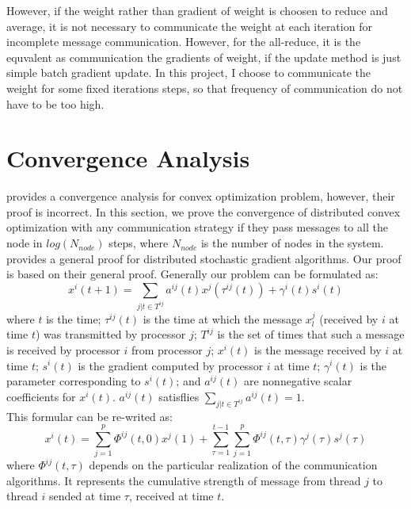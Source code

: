 \documentclass{article}
\begin{document}
However, if the weight rather than gradient of weight is choosen to reduce and average, it is not necessary to communicate the weight at each iteration for incomplete message communication. However, for the all-reduce, it is the equvalent as communication the gradients of weight, if the update method is just simple batch gradient update. In this project, I choose to communicate the weight for some fixed iterations steps, so that frequency of communication do not have to be too high.

\section{Convergence Analysis}
\cite{zhao2013butterfly} provides a convergence analysis for convex optimization problem, however, their proof is incorrect. In this section, we prove the convergence of distributed convex optimization with any communication strategy if they pass messages to all the node in $log(N_{node})$ steps, where $N_{node}$ is the number of nodes in the system.\\

\cite{parallelDistCom} provides a general proof for distributed stochastic gradient algorithms. Our proof is based on their general proof. Generally our problem can be formulated as: \\
\[x^i(t+1) = \sum_{j|t \in T^{ij}} a^{ij}(t)x^j(\tau^{ij}(t)) + \gamma^i(t)s^i(t)\]
where $t$ is the time; $\tau^{ij}(t)$ is the time at which the message $x_l^j$ (received by $i$ at time $t$) was transmitted by processor $j$; $T^{ij}$ is the set of times that such a message is received by processor $i$ from processor $j$; $x^i(t)$ is the message received by $i$ at time $t$; $s^i(t)$ is the gradient computed by processor $i$ at time $t$; $\gamma^i(t)$ is the parameter corresponding to $s^i(t)$; and $a^{ij}(t)$ are nonnegative scalar coefficients for $x^i(t)$. $a^{ij}(t)$ satisflies $\sum_{j|t \in T^{ij}}a^{ij}(t) = 1$.\\

This formular can be re-writed as:\\
\[x^i(t) = \sum_{j=1}^p \Phi^{ij}(t,0)x^j(1) + \sum_{\tau = 1} ^{t-1} \sum_{j=1}^p \Phi^{ij}(t,\tau)\gamma^j(\tau)s^j(\tau)\]
where $\Phi^{ij}(t,\tau)$ depends on the particular realization of the communication algorithms. It represents the cumulative strength of message from thread $j$ to thread $i$ sended at time $\tau$, received at time $t$.    \\
\end{document}
